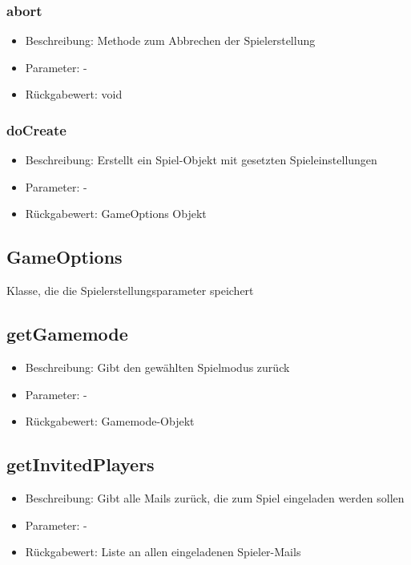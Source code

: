 \documentclass[a4paper]{scrreprt}
\begin{document}
    \subsubsection{abort}
    \begin{itemize}
        \item Beschreibung: Methode zum Abbrechen der Spielerstellung
        \item Parameter: -
        \item Rückgabewert: void
    \end{itemize}
    \subsubsection{doCreate}
    \begin{itemize}
        \item Beschreibung: Erstellt ein Spiel-Objekt mit gesetzten Spieleinstellungen
        \item Parameter: -
        \item Rückgabewert: GameOptions Objekt
    \end{itemize}

    \subsection{GameOptions}
    Klasse, die die Spielerstellungsparameter speichert
    \subsection{getGamemode}
    \begin{itemize}
        \item Beschreibung: Gibt den gewählten Spielmodus zurück
        \item Parameter: -
        \item Rückgabewert: Gamemode-Objekt
    \end{itemize}
    \subsection{getInvitedPlayers}
    \begin{itemize}
        \item Beschreibung: Gibt alle Mails zurück, die zum Spiel eingeladen werden sollen
        \item Parameter: -
        \item Rückgabewert: Liste an allen eingeladenen Spieler-Mails
    \end{itemize}
\end{document}

